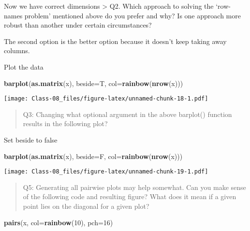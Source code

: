 \documentclass[]{article}
\newenvironment{Shaded}{\begin{snugshade}}{\end{snugshade}}
\newcommand{\DataTypeTok}[1]{\textcolor[rgb]{0.13,0.29,0.53}{#1}}
\newcommand{\DecValTok}[1]{\textcolor[rgb]{0.00,0.00,0.81}{#1}}
\newcommand{\KeywordTok}[1]{\textcolor[rgb]{0.13,0.29,0.53}{\textbf{#1}}}
\newcommand{\NormalTok}[1]{#1}
\begin{document}
Now we have correct dimensions \textgreater{} Q2. Which approach to
solving the `row-names problem' mentioned above do you prefer and why?
Is one approach more robust than another under certain circumstances?

The second option is the better option because it doesn't keep taking
away columns.

Plot the data

\begin{Shaded}
\begin{Highlighting}[]
\KeywordTok{barplot}\NormalTok{(}\KeywordTok{as.matrix}\NormalTok{(x), }\DataTypeTok{beside=}\NormalTok{T, }\DataTypeTok{col=}\KeywordTok{rainbow}\NormalTok{(}\KeywordTok{nrow}\NormalTok{(x)))}
\end{Highlighting}
\end{Shaded}

\texttt{[image: Class-08\_files/figure-latex/unnamed-chunk-18-1.pdf]}

\begin{quote}
Q3: Changing what optional argument in the above barplot() function
results in the following plot?
\end{quote}

Set beside to false

\begin{Shaded}
\begin{Highlighting}[]
\KeywordTok{barplot}\NormalTok{(}\KeywordTok{as.matrix}\NormalTok{(x), }\DataTypeTok{beside=}\NormalTok{F, }\DataTypeTok{col=}\KeywordTok{rainbow}\NormalTok{(}\KeywordTok{nrow}\NormalTok{(x)))}
\end{Highlighting}
\end{Shaded}

\texttt{[image: Class-08\_files/figure-latex/unnamed-chunk-19-1.pdf]}

\begin{quote}
Q5: Generating all pairwise plots may help somewhat. Can you make sense
of the following code and resulting figure? What does it mean if a given
point lies on the diagonal for a given plot?
\end{quote}

\begin{Shaded}
\begin{Highlighting}[]
\KeywordTok{pairs}\NormalTok{(x, }\DataTypeTok{col=}\KeywordTok{rainbow}\NormalTok{(}\DecValTok{10}\NormalTok{), }\DataTypeTok{pch=}\DecValTok{16}\NormalTok{)}
\end{Highlighting}
\end{Shaded}
\end{document}
